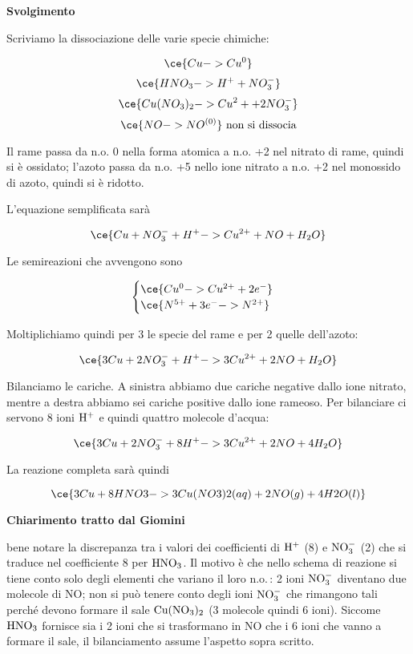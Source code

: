 \large\textbf{Svolgimento}\normalsize

\vspace{0.2cm}Scriviamo la dissociazione delle varie specie chimiche:

$$\ce{Cu -> Cu^0}$$
$$\ce{HNO_3 -> H^+ + NO_3^-}$$
$$\ce{Cu(NO_3)_2 -> Cu^2+ + 2NO_3^-}$$
$$\ce{NO -> NO^{(0)}} \text{ non si dissocia}$$

Il rame passa da n.o. 0 nella forma atomica a n.o. +2 nel nitrato di rame, quindi si è ossidato; l'azoto passa da n.o. +5 nello ione nitrato a n.o. +2 nel monossido di azoto, quindi si è ridotto.

L'equazione semplificata sarà

$$\ce{Cu + NO_3^- + H^+ -> Cu^{2+} + NO + H_2O}$$

Le semireazioni che avvengono sono

$$\begin{cases}
    \ce{Cu^0 -> Cu^{2+} + 2e^-}\\
    \ce{N^{5+} + 3e^- -> N^{2+}}
\end{cases}$$

Moltiplichiamo quindi per 3 le specie del rame e per 2 quelle dell'azoto:

$$\ce{3Cu + 2NO_3^- + H^+ -> 3Cu^{2+} + 2NO + H_2O}$$

Bilanciamo le cariche. A sinistra abbiamo due cariche negative dallo ione nitrato, mentre a destra abbiamo sei cariche positive dallo ione rameoso. Per bilanciare ci servono 8 ioni $\rm H^+$ e quindi quattro molecole d'acqua:

$$\ce{3Cu + 2NO_3^- + 8H^+ -> 3Cu^{2+} + 2NO + 4H_2O}$$

La reazione completa sarà quindi

$$\ce{3Cu + 8HNO3 -> 3Cu(NO3)2(aq) + 2NO(g) + 4H2O(l)}$$

\textbf{Chiarimento tratto dal Giomini}

\E bene notare la discrepanza tra i valori dei coefficienti di $\rm H^+$ (8) e $\rm NO_3^-$ (2) che si traduce nel coefficiente 8 per $\rm HNO_3$. Il motivo è che nello schema di reazione si tiene conto solo degli elementi che variano il loro n.o.\,: 2 ioni $\rm NO_3^-$ diventano due molecole di NO; non si può tenere conto degli ioni $\rm NO_3^-$ che rimangono tali perché devono formare il sale $\rm Cu(NO_3)_2$ (3 molecole quindi 6 ioni). Siccome $\rm HNO_3$ fornisce sia i 2 ioni che si trasformano in NO che i 6 ioni che vanno a formare il sale, il bilanciamento assume l'aspetto sopra scritto.

